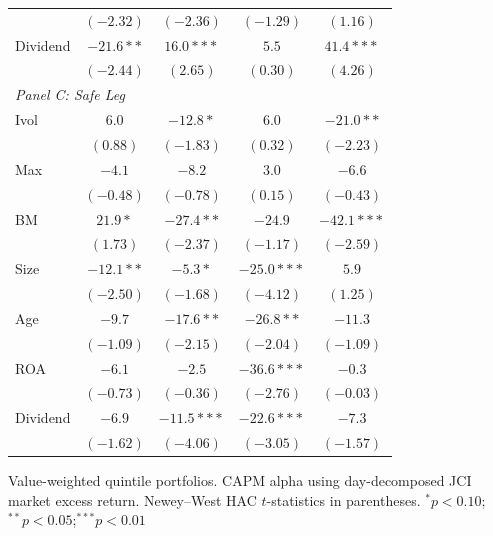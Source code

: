 \begin{tabular}{l c c c c}
 & $(-2.32)$ & $(-2.36)$ & $(-1.29)$ & $(1.16)$ \\
Dividend & $-21.6**$ & $16.0***$ & $5.5$ & $41.4***$ \\
 & $(-2.44)$ & $(2.65)$ & $(0.30)$ & $(4.26)$ \\
\midrule
\multicolumn{5}{l}{\textit{Panel C: Safe Leg}} \\
Ivol & $6.0$ & $-12.8*$ & $6.0$ & $-21.0**$ \\
 & $(0.88)$ & $(-1.83)$ & $(0.32)$ & $(-2.23)$ \\
Max & $-4.1$ & $-8.2$ & $3.0$ & $-6.6$ \\
 & $(-0.48)$ & $(-0.78)$ & $(0.15)$ & $(-0.43)$ \\
BM & $21.9*$ & $-27.4**$ & $-24.9$ & $-42.1***$ \\
 & $(1.73)$ & $(-2.37)$ & $(-1.17)$ & $(-2.59)$ \\
Size & $-12.1**$ & $-5.3*$ & $-25.0***$ & $5.9$ \\
 & $(-2.50)$ & $(-1.68)$ & $(-4.12)$ & $(1.25)$ \\
Age & $-9.7$ & $-17.6**$ & $-26.8**$ & $-11.3$ \\
 & $(-1.09)$ & $(-2.15)$ & $(-2.04)$ & $(-1.09)$ \\
ROA & $-6.1$ & $-2.5$ & $-36.6***$ & $-0.3$ \\
 & $(-0.73)$ & $(-0.36)$ & $(-2.76)$ & $(-0.03)$ \\
Dividend & $-6.9$ & $-11.5***$ & $-22.6***$ & $-7.3$ \\
 & $(-1.62)$ & $(-4.06)$ & $(-3.05)$ & $(-1.57)$ \\
\bottomrule
\end{tabular}
\vspace{4pt}
\begin{minipage}{0.9\textwidth}
\footnotesize
Value-weighted quintile portfolios. CAPM alpha using day-decomposed JCI market excess return.
Newey--West HAC $t$-statistics in parentheses.
$^{*}p<0.10$;\quad $^{**}p<0.05$;\quad $^{***}p<0.01$
\end{minipage}